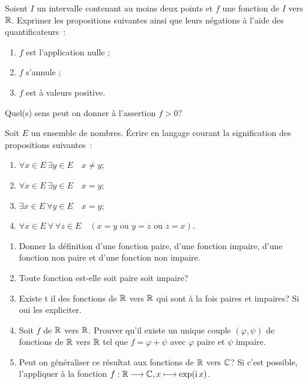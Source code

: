 \begin{exercice}
    Soient \(I\) un intervalle contenant au moins deux points et \(f\) une fonction de \(I\) vers \(\mathbb{R}\). Exprimer les
    propositions suivantes ainsi que leurs négations à l'aide des quantificateurs~:
    \begin{enumerate}
        \item \(f\) est l'application nulle ;
        \item \(f\) s'annule ;
        \item \(f\) est à valeurs positive.
    \end{enumerate}
    Quel(s) sens peut on donner à l'assertion \(f>0\)?
\end{exercice}

\begin{exercice}
    Soit \(E\) un ensemble de nombres. Écrire en langage courant la signification des propositions suivantes~:
    \begin{enumerate}
        \item \(\forall x \in E \ \exists y \in E \quad x \neq y\);
        \item \(\forall x \in E \ \exists y \in E \quad x = y\);
        \item \(\exists x \in E \ \forall y \in E \quad x = y\);
        \item \(\forall x \in E \ \forall \ \forall z \in E \quad (x=y \textrm{~ou~}
            y=z \textrm{~ou~} z=x)\).
    \end{enumerate}
\end{exercice}

\begin{exercice}
    \begin{enumerate}
        \item Donner la définition d'une fonction paire, d'une fonction impaire,
            d'une fonction non paire et d'une fonction non impaire.
        \item Toute fonction est-elle soit paire soit impaire?
        \item Existe t il des fonctions de \(\mathbb{R}\) vers \(\mathbb{R}\) qui sont à la fois
            paires  et impaires? Si oui les expliciter.
        \item Soit \(f\) de \(\mathbb{R}\) vers \(\mathbb{R}\). Prouver qu'il existe un unique
            couple \((\varphi, \psi)\) de fonctions de \(\mathbb{R}\) vers \(\mathbb{R}\) tel que
            \(f=\varphi+\psi\) avec \(\varphi\) paire et \(\psi\) impaire.
        \item Peut on généraliser ce résultat aux fonctions de \(\mathbb{R}\) vers \(\mathbb{C}\)?
            Si c'est possible, l'appliquer à la fonction
            \(f:\mathbb{R} \longrightarrow \mathbb{C}, x \longmapsto \exp(\operatorname{i} x)\).
    \end{enumerate}
\end{exercice}

